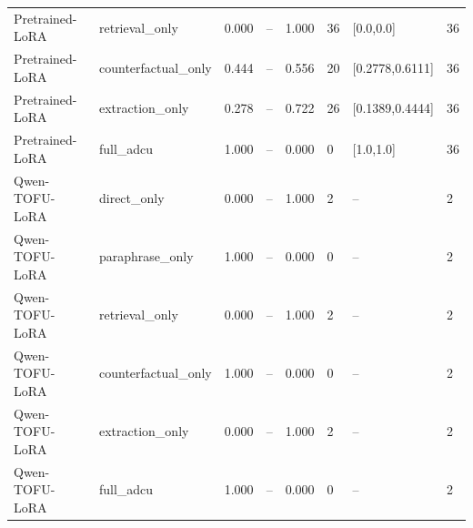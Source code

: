 \documentclass[10pt,journal,compsoc]{IEEEtran}
\begin{document}
\begin{table}[t]
{\begin{tabular}{llllllll}
Pretrained-LoRA & retrieval\_only & 0.000 & -- & 1.000 & 36 & [0.0,0.0] & 36 \\
Pretrained-LoRA & counterfactual\_only & 0.444 & -- & 0.556 & 20 & [0.2778,0.6111] & 36 \\
Pretrained-LoRA & extraction\_only & 0.278 & -- & 0.722 & 26 & [0.1389,0.4444] & 36 \\
Pretrained-LoRA & full\_adcu & 1.000 & -- & 0.000 & 0 & [1.0,1.0] & 36 \\
Qwen-TOFU-LoRA & direct\_only & 0.000 & -- & 1.000 & 2 & -- & 2 \\
Qwen-TOFU-LoRA & paraphrase\_only & 1.000 & -- & 0.000 & 0 & -- & 2 \\
Qwen-TOFU-LoRA & retrieval\_only & 0.000 & -- & 1.000 & 2 & -- & 2 \\
Qwen-TOFU-LoRA & counterfactual\_only & 1.000 & -- & 0.000 & 0 & -- & 2 \\
Qwen-TOFU-LoRA & extraction\_only & 0.000 & -- & 1.000 & 2 & -- & 2 \\
Qwen-TOFU-LoRA & full\_adcu & 1.000 & -- & 0.000 & 0 & -- & 2 \\
\bottomrule
\end{tabular}%
}
\end{table}


\begin{table}[t]
\centering
\caption{Redacted failure-mode case study comparing clean and post-deletion behavior.}
\label{tab:failure_mode_case}
\end{table}
\end{document}
